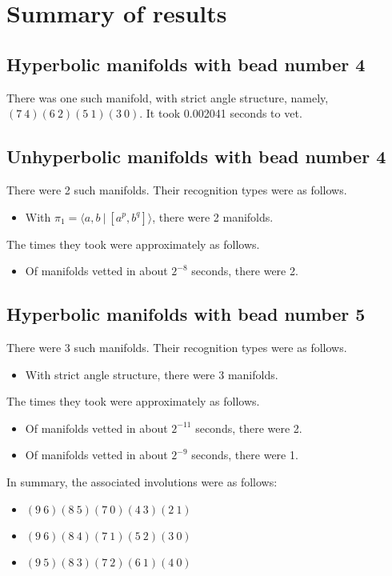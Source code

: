 \documentclass{article}
\begin{document}
\section{Summary of results}
\subsection{Hyperbolic manifolds with bead number 4}
There was one such manifold, with strict angle structure,
namely, $(7\ 4)(6\ 2)(5\ 1)(3\ 0)$.
It took 0.002041 seconds to vet.
\subsection{Unhyperbolic manifolds with bead number 4}
There were 2 such manifolds.
Their recognition types were as follows.
\begin{itemize}
\item With $\pi_1 = \langle a,b\ |\ [a^p,b^q]\rangle$, there were 2 manifolds.
\end{itemize}
The times they took were approximately as follows.
\begin{itemize}
\item Of manifolds vetted in about $2^{-8}$ seconds, there were 2.
\end{itemize}
\subsection{Hyperbolic manifolds with bead number 5}
There were 3 such manifolds.
Their recognition types were as follows.
\begin{itemize}
\item With strict angle structure, there were 3 manifolds.
\end{itemize}
The times they took were approximately as follows.
\begin{itemize}
\item Of manifolds vetted in about $2^{-11}$ seconds, there were 2.
\item Of manifolds vetted in about $2^{-9}$ seconds, there were 1.
\end{itemize}
In summary, the associated involutions were as follows:
\begin{itemize}
\item $(9\ 6)(8\ 5)(7\ 0)(4\ 3)(2\ 1)$
\item $(9\ 6)(8\ 4)(7\ 1)(5\ 2)(3\ 0)$
\item $(9\ 5)(8\ 3)(7\ 2)(6\ 1)(4\ 0)$
\end{itemize}
\end{document}
